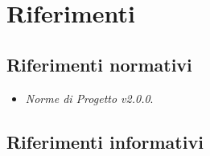 \section{Riferimenti}\label{IntroduzioneRiferimenti}
\subsection{Riferimenti normativi}\label{IntroduzioneRiferimentiRiferimentiNormativi}
\begin{itemize}
	\item \textit{Norme di Progetto v2.0.0}.
\end{itemize}
\subsection{Riferimenti informativi}\label{IntroduzioneRiferimentiRiferimentiInformativi}
